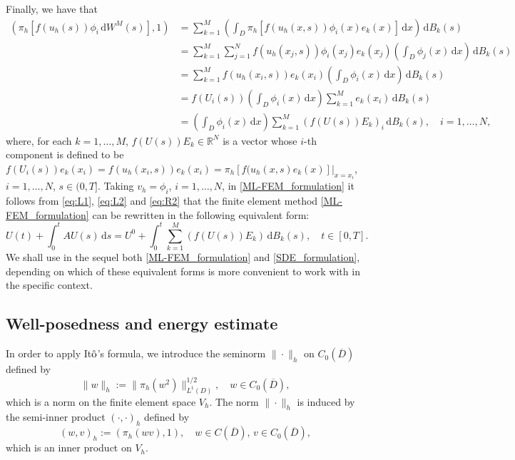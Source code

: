 \documentclass[12pt]{article}
\newcommand{\dd}{\,\mathrm{d}}
\begin{document}
{Finally, we have that 
%
\begin{align}\label{eq:R2}
(\pi_h [f(u_h(s)) \phi_i \dd W^M(s)], 1)
&= \sum_{k=1}^M \left(\int_D \pi_h [f(u_h(x,s)) \phi_i(x) e_k(x)] \dd x \right)\! \dd B_k(s)\nonumber\\
&=\sum_{k=1}^M \sum_{j=1}^N f(u_h(x_j,s))\phi_i(x_j) e_k(x_j)\left(\int_D \phi_j(x)\dd x \right)\! \dd B_k(s)\nonumber\\
&=\sum_{k=1}^M f(u_h(x_i,s)) e_k(x_i) \left(\int_D \phi_i(x)\dd x \right)\! \dd B_k(s)\nonumber\\
&=f(U_i(s)) \left(\int_D \phi_i(x)\dd x \right) \sum_{k=1}^M e_k(x_i) \dd B_k(s)\nonumber\\
&= \left(\int_D \phi_i(x)\dd x \right) \sum_{k=1}^M (f(U(s)) E_k)_i \dd B_k(s),\quad i=1,\ldots,N,
\end{align}
%
where, for each $k=1,\ldots,M$, $f(U(s))E_k \in \mathbb{R}^N$ is a vector whose $i$-th component is defined to be $f(U_i(s))e_k(x_i) = f(u_h(x_i,s))e_k(x_i)=\pi_h[f(u_h(x,s)e_k(x)]|_{x=x_i}$,  $i=1,\ldots,N$, $s \in (0,T]$.
%
Taking $v_h = \phi_i$, $i=1,\ldots,N$, in \eqref{ML-FEM_formulation} it follows from \eqref{eq:L1}, \eqref{eq:L2} and \eqref{eq:R2} that the  finite element method \eqref{ML-FEM_formulation} can be rewritten in the following equivalent form:
%
\begin{equation}\label{SDE_formulation}
    U(t) + \int_0^t AU(s) \dd s 
    = U^0 + \int_0^t\sum_{k=1}^M  (f(U(s)) E_k) \dd B_k(s),\quad t \in [0,T].
\end{equation}
We shall use in the sequel both \eqref{ML-FEM_formulation} and \eqref{SDE_formulation}, depending on which of these equivalent forms is more convenient to work with in the specific context.


\subsection{Well-posedness and energy estimate}

In order to apply It$\hat{\rm o}$'s formula, we introduce the seminorm $ \| \cdot \|_h$ on $C_0(\overline{D})$ defined by
%
\begin{equation}
\label{eq:discrete-norm}
    \| w \|_h := \| \pi_h(w^2) \|^{1/2}_{L^1(D)},\quad w \in C_0(\overline{D}),
\end{equation}
which is a norm on the finite element space $V_h$. The norm $\|\cdot\|_h$ is induced by the semi-inner product $(\cdot,\cdot)_h$ defined by
%
\begin{equation}
\label{eq:discrete-scalar}
    (w, v)_h := (\pi_h(w v), 1), \quad w \in C(\overline{D}),\, v \in C_0(\overline{D}),
\end{equation}
%
which is an inner product on $V_h$. 

}
\end{document}

